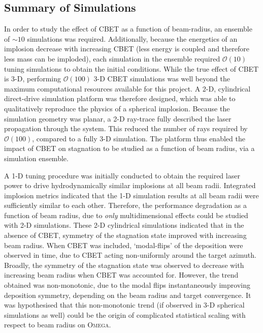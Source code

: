 \subsection{Summary of Simulations}

In order to study the effect of \ac{CBET} as a function of beam-radius, an ensemble of $\sim10$ simulations was required.
Additionally, because the energetics of an implosion decrease with increasing \ac{CBET} (less energy is coupled and therefore less mass can be imploded), each simulation in the ensemble required $\mathcal{O}(10)$ tuning simulations to obtain the initial conditions.
While the true effect of \ac{CBET} is 3-D, performing $\mathcal{O}(100)$ 3-D \ac{CBET} simulations was well beyond the maximum computational resources available for this project.
A 2-D, cylindrical direct-drive simulation platform was therefore designed, which was able to qualitatively reproduce the physics of a spherical implosion.
Because the simulation geometry was planar, a 2-D ray-trace fully described the laser propagation through the system.
This reduced the number of rays required by $\mathcal{O}(100)$, compared to a fully 3-D simulation.
The platform thus enabled the impact of \ac{CBET} on stagnation to be studied as a function of beam radius, via a simulation ensemble.

A 1-D tuning procedure was initially conducted to obtain the required laser power to drive hydrodynamically similar implosions at all beam radii.
Integrated implosion metrics indicated that the 1-D simulation results at all beam radii were sufficiently similar to each other.
Therefore, the performance degradation as a function of beam radius, due to \textit{only} multidimensional effects could be studied with 2-D simulations.
These 2-D cylindrical simulations indicated that in the absence of \ac{CBET}, symmetry of the stagnation state improved with increasing beam radius.
When \ac{CBET} was included, `modal-flips' of the deposition were observed in time, due to \ac{CBET} acting non-uniformly around the target azimuth.
Broadly, the symmetry of the stagnation state was observed to decrease with increasing beam radius when \ac{CBET} was accounted for.
However, the trend obtained was non-monotonic, due to the modal flips instantaneously improving deposition symmetry, depending on the beam radius and target convergence.
It was hypothesised that this non-monotonic trend (if observed in 3-D spherical simulations as well) could be the origin of complicated statistical scaling with respect to beam radius on \textsc{Omega}.

